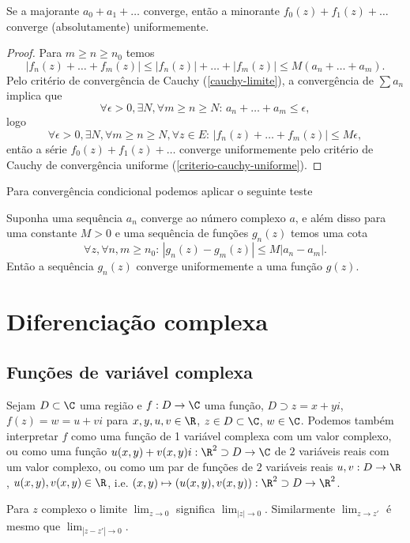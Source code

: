 \begin{prop}
\label{weierstrass-m}
Se a majorante $a_0 + a_1 + \dots$ converge,
então a minorante $f_0(z) + f_1(z) + \dots$ converge (absolutamente) uniformemente.
\end{prop}
\begin{proof}
Para $m\geq n\geq n_0$ temos
\[ |f_n(z) + \dots + f_m(z)| \leq |f_n(z)| + \dots + |f_m(z)| \leq  M(a_n + \dots + a_m). \]
Pelo critério de convergência de Cauchy (\cref{cauchy-limite}), a convergência de $\sum a_n$ implica que
\[ \forall \epsilon>0,\exists N,\forall m\geq n\geq N: \, a_n + \dots + a_m \leq \epsilon, \]
logo
\[ \forall \epsilon>0,\exists N,\forall m\geq n\geq N,\forall z\in E: \,
 |f_n(z) + \dots + f_m(z)| \leq M \epsilon, \]
então a série $f_0(z) + f_1(z) + \dots$ converge uniformemente pelo critério
de Cauchy de convergência uniforme (\cref{criterio-cauchy-uniforme}).
\end{proof}

Para convergência condicional podemos aplicar o seguinte teste
\begin{prop}
Suponha uma sequência $a_n$ converge ao número complexo $a$,
e além disso para uma constante $M>0$ e uma sequência de funções $g_n(z)$ temos uma cota
\[\forall z,\forall n,m\geq n_0:\,  |g_n(z) - g_m(z)| \leq M |a_n-a_m|. \]
Então a sequência $g_n(z)$ converge uniformemente a uma função $g(z)$.
\end{prop}

\section{Diferenciação complexa}

\subsection{Funções de variável complexa}

Sejam $D\subset \C$ uma região e $f : D \to \C$ uma função,
$D\supset z = x + yi$, $f(z) = w = u + v i$ para $x,y,u,v\in \R$, $z\in D\subset \C$, $w\in \C$.
Podemos também interpretar $f$ como uma função de 1 variável complexa com um valor complexo,
ou como uma função $u(x,y) + v(x,y) i : \R^2\supset D \to \C$ de $2$ variáveis reais com um valor complexo,
ou como um par de funções de $2$ variáveis reais
$u,v : D \to \R$, $u(x,y), v(x,y) \in \R$,
i.e. $(x,y) \mapsto (u(x,y),v(x,y)) : \R^2 \supset D \to \R^2$.

Para $z$ complexo o limite $\lim_{z\to 0}$ significa $\lim_{|z|\to 0}$.
Similarmente $\lim_{z\to z'}$ é mesmo que $\lim_{|z-z'|\to 0}$.

